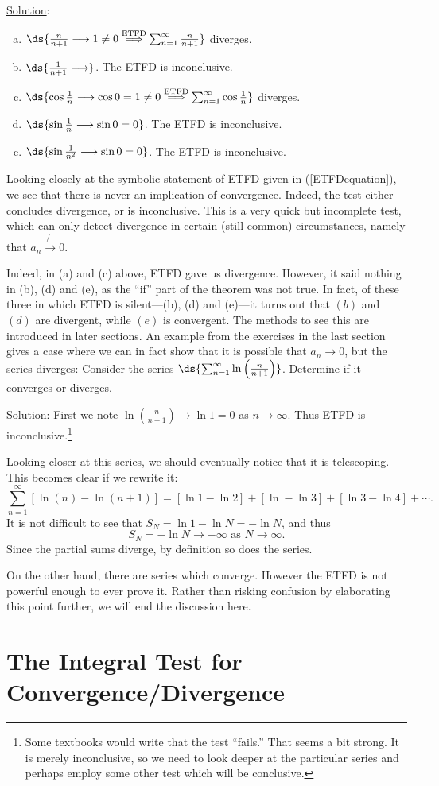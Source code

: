 \underline{Solution}: 
\begin{enumerate}[(a)]
\item $\ds{\frac{n}{n+1}\longrightarrow1\ne0
        \overset{\text{\rm ETFD}}{\implies}
           \sum_{n=1}^\infty \frac{n}{n+1}}$ diverges.
\item $\ds{\frac1{n+1}\longrightarrow}$.  The 
      ETFD is inconclusive.
\item $\ds{\cos\frac1n\longrightarrow\cos0=1\ne0
        \overset{\text{\rm ETFD}}{\implies}
        \sum_{n=1}^\infty\cos\frac1{n}}$ diverges.
\item $\ds{\sin\frac1n\longrightarrow\sin0=0}$.
       The ETFD is inconclusive.
\item $\ds{\sin\frac1{n^2}\longrightarrow\sin0=0}$.
       The ETFD is inconclusive. 
\end{enumerate}
\eex

Looking closely at the symbolic statement of ETFD given
in (\ref{ETFDequation}), we see that there is never an 
implication of convergence.  Indeed, the test either concludes 
divergence, or is inconclusive.  This is a very quick but incomplete test,
which can only detect divergence in certain (still common) circumstances,
namely that $a_n\not{\!\!\to}0$.

Indeed, in (a) and (c) above, ETFD gave us divergence.
However, it said nothing in (b), (d) and (e), as the
``if'' part of the theorem was not true.  In fact,
of these three in which ETFD is silent---(b), (d) and (e)---it
turns out that $(b)$ and $(d)$ are divergent, while
$(e)$ is convergent.  The methods to see this are introduced
in later sections.  An example from the exercises
in the last section gives a case where we can in fact
show that it is possible that $a_n\to0$, but the series diverges:
\bex Consider the series 
$\ds{\sum_{n=1}^\infty\ln\left(\frac{n}{n+1}\right)}$.
Determine if it converges or diverges.

\underline{Solution}: First we note ${\ln\left(\frac{n}{n+1}\right)
\longrightarrow\ln1=0}$ as $n\to\infty$.  Thus ETFD is inconclusive.\footnote{
Some textbooks would write that the test ``fails.''
That seems a bit strong.  It is merely inconclusive, so we need
to look deeper at the particular series and perhaps employ some other test
which will be conclusive.}

Looking closer at this series, we should eventually notice that
it is telescoping.  This becomes clear
if we rewrite it:
$$\sum_{n=1}^\infty\left[\ln(n)-\ln(n+1)\right]
  =\left[\ln 1-\ln 2\right]+\left[\ln-\ln3\right] 
    +\left[\ln 3-\ln 4\right]+\cdots.$$
It is not difficult to see that $S_N=\ln1-\ln N=-\ln N$,
and thus
$$S_N=-\ln N\longrightarrow-\infty\text{ as }N\to\infty.$$
Since the partial sums diverge, by definition so does the series.
\eex 

On the other hand, there are series which converge.  However the ETFD
is not powerful enough to ever prove it.  Rather than risking confusion
by elaborating this point further, we will end the discussion here.

\newpage\section{The Integral Test for Convergence/Divergence}



